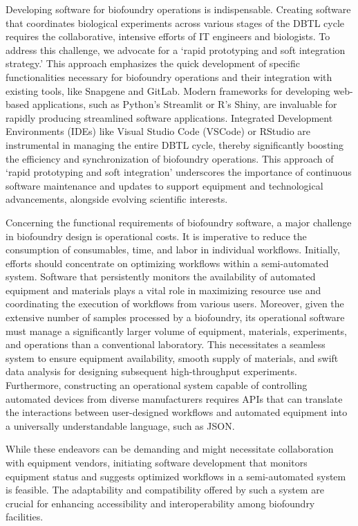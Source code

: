 \documentclass[
  letterpaper,
]{book}
\begin{document}
Developing software for biofoundry operations is indispensable. Creating
software that coordinates biological experiments across various stages
of the DBTL cycle requires the collaborative, intensive efforts of IT
engineers and biologists. To address this challenge, we advocate for a
`rapid prototyping and soft integration strategy.' This approach
emphasizes the quick development of specific functionalities necessary
for biofoundry operations and their integration with existing tools,
like Snapgene and GitLab. Modern frameworks for developing web-based
applications, such as Python's Streamlit or R's Shiny, are invaluable
for rapidly producing streamlined software applications. Integrated
Development Environments (IDEs) like Visual Studio Code (VSCode) or
RStudio are instrumental in managing the entire DBTL cycle, thereby
significantly boosting the efficiency and synchronization of biofoundry
operations. This approach of `rapid prototyping and soft integration'
underscores the importance of continuous software maintenance and
updates to support equipment and technological advancements, alongside
evolving scientific interests.

Concerning the functional requirements of biofoundry software, a major
challenge in biofoundry design is operational costs. It is imperative to
reduce the consumption of consumables, time, and labor in individual
workflows. Initially, efforts should concentrate on optimizing workflows
within a semi-automated system. Software that persistently monitors the
availability of automated equipment and materials plays a vital role in
maximizing resource use and coordinating the execution of workflows from
various users. Moreover, given the extensive number of samples processed
by a biofoundry, its operational software must manage a significantly
larger volume of equipment, materials, experiments, and operations than
a conventional laboratory. This necessitates a seamless system to ensure
equipment availability, smooth supply of materials, and swift data
analysis for designing subsequent high-throughput experiments.
Furthermore, constructing an operational system capable of controlling
automated devices from diverse manufacturers requires APIs that can
translate the interactions between user-designed workflows and automated
equipment into a universally understandable language, such as JSON.

While these endeavors can be demanding and might necessitate
collaboration with equipment vendors, initiating software development
that monitors equipment status and suggests optimized workflows in a
semi-automated system is feasible. The adaptability and compatibility
offered by such a system are crucial for enhancing accessibility and
interoperability among biofoundry facilities.
\end{document}
